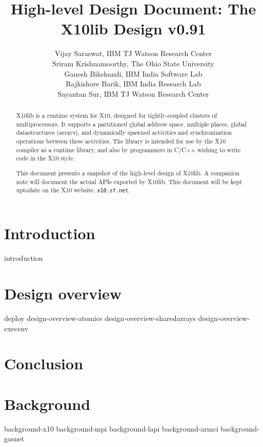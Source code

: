 \documentclass{article}
\def\Xten{{\sf X10}}
\def\Xtenlib{{\sf X10lib}}
\begin{document}
\title{High-level Design Document: The \Xtenlib{} Design v0.91}
\author{Vijay Saraswat, IBM TJ Watson Research Center \\
  Sriram Krishnamoorthy, The Ohio State University \\
  Ganesh Bikshandi, IBM India Software Lab \\
  Rajkishore Barik, IBM India Research Lab \\
  Sayantan Sur, IBM TJ Watson Research Center}

\maketitle

\thispagestyle{fancy}


\begin{abstract}
{}\Xtenlib{} is a runtime system for \Xten{}, designed for
tightly-coupled clusters of multiprocessors. It supports a partitioned
global address space, multiple places, global datastructures (arrays),
and dynamically spawned activities and synchronization operations
between these activities. The library is intended for use by the
\Xten{} compiler as a runtime library, and also by programmers in
C/C++ wishing to write code in the \Xten{} style.

This document presents a snapshot of the high-level design of
\Xtenlib{}. A companion note will document the actual APIs exported by
\Xtenlib. This document will be kept uptodate on the \Xten{} website,
{\tt x10.sf.net}.
\end{abstract}

\section{Introduction}
 {introduction}


\section{Design overview}

 {deploy}
 {design-overview-atomics}
 {design-overview-sharedarrays}
 {design-overview-execenv}

\section{Conclusion}

%

%
\appendix
\section{Background}
 {background-x10}
 {background-mpi}
 {background-lapi}
 {background-armci}
 {background-gasnet}





\end{document}
